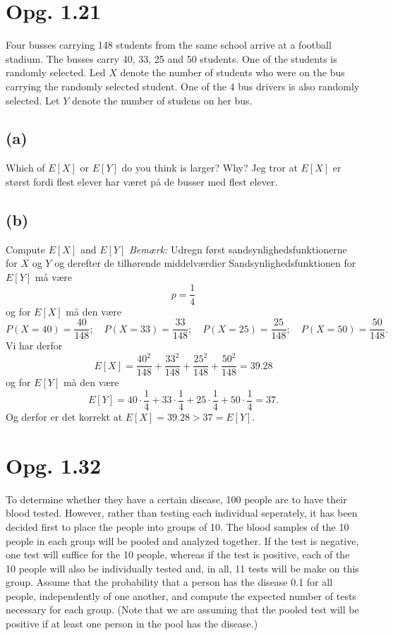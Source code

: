 \documentclass[12pt]{article}
\theoremstyle{definition}
\begin{document}
\section*{Opg. 1.21}
Four busses carrying 148 students from the same school arrive at a football stadium. The busses carry 40, 33, 25 and 50 students. One of the students is randomly selected. Led $X$ denote the number of students who were on the bus carrying the randomly selected student. One of the 4 bus drivers is also randomly selected. Let $Y$ denote the number of studens on her bus.

\subsection*{(a)}
Which of $E[X]$ or $E[Y]$ do you think is larger? Why?
\bigbreak
Jeg tror at $E[X]$ er størst fordi flest elever har været på de busser med flest elever.

\subsection*{(b)}
Compute $E[X]$ and $E[Y]$
\textit{Bemærk:} Udregn først sandsynlighedsfunktionerne for $X$ og $Y$ og derefter de tilhørende middelværdier
\bigbreak
Sandsynlighedsfunktionen for $E[Y]$ må være
\[ 
p = \frac{1}{4}
\]
og for $E[X]$ må den være
\[ 
P(X = 40) = \frac{40}{148}; \quad P(X = 33) = \frac{33}{148}; \quad P(X = 25) = \frac{25}{148}; \quad P(X = 50) = \frac{50}{148}
.\]
Vi har derfor
\[ 
  E[X] = \frac{40^2}{148} + \frac{33^2}{148} + \frac{25^2}{148} + \frac{50^2}{148} = \num{39,28}
\]
og for $E[Y]$ må den være
\[ 
  E[Y] = 40 \cdot \frac{1}{4} + 33 \cdot \frac{1}{4} + 25 \cdot \frac{1}{4} + 50 \cdot \frac{1}{4} = 37
.\]
Og derfor er det korrekt at $E[X] = \num{39,28} > 37 = E[Y]$. 


\section*{Opg. 1.32}
To determine whether they have a certain disease, 100 people are to have their blood tested. However, rather than testing each individual seperately, it has been decided first to place the people into groups of 10. The blood samples of the 10 people in each group will be pooled and analyzed together. If the test is negative, one test will suffice for the 10 people, whereas if the test is positive, each of the 10 people will also be individually tested and, in all, 11 tests will be make on this group. Assume that the probability that a person has the disease \num{0,1} for all people, independently of one another, and compute the expected number of tests necessary for each group. (Note that we are assuming that the pooled test will be positive if at least one person in the pool has the disease.)
\end{document}
